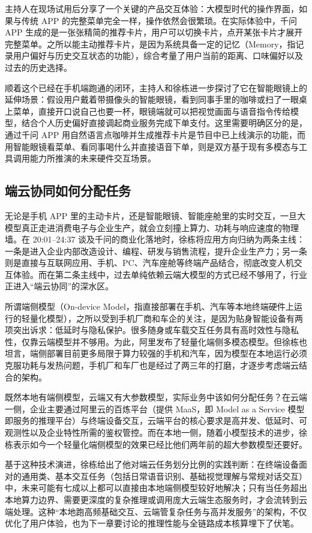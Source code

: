 \documentclass[UTF8,a4paper,11pt,fontset=fandol]{ctexart}
\begin{document}
主持人在现场试用后分享了一个关键的产品交互体验：大模型时代的操作界面，如果与传统 APP 的完整菜单完全一样，操作依然会很繁琐。在实际体验中，千问 APP 生成的是一张张精简的推荐卡片，用户可以切换卡片，点开某张卡片才展开完整菜单。之所以能主动推荐卡片，是因为系统具备一定的记忆（Memory，指记录用户偏好与历史交互状态的功能），综合考量了用户当前的距离、口味偏好以及过去的历史选择。

顺着这个已经在手机端跑通的闭环，主持人和徐栋进一步探讨了它在智能眼镜上的延伸场景：假设用户戴着带摄像头的智能眼镜，看到同事手里的咖啡或扫了一眼桌上菜单，直接开口说自己也要一杯，眼镜端就可以把视觉画面与语音指令传给模型，结合个人历史偏好直接调起商业服务完成下单支付。这里需要明确区分的是，通过千问 APP 用自然语言点咖啡并生成推荐卡片是节目中已上线演示的功能，而用智能眼镜看菜单、看同事喝什么并直接语音下单，则是双方基于现有多模态与工具调用能力所推演的未来硬件交互场景。

\subsection{端云协同如何分配任务}
无论是手机 APP 里的主动卡片，还是智能眼镜、智能座舱里的实时交互，一旦大模型真正走进消费电子与企业生产，就会立刻撞上算力、功耗与响应速度的物理墙。在 20:01–24:37 谈及千问的商业化落地时，徐栋将应用方向归纳为两条主线：一条是进入企业内部改造设计、编程、研发与销售流程，提升企业生产力；另一条则是直接与互联网应用、手机、PC、汽车座舱等终端产品结合，彻底改变人机交互体验。而在第二条主线中，过去单纯依赖云端大模型的方式已经不够用了，行业正进入“端云协同”的深水区。

所谓端侧模型（On-device Model，指直接部署在手机、汽车等本地终端硬件上运行的轻量化模型），之所以受到手机厂商和车企的关注，是因为贴身智能设备有两项突出诉求：低延时与隐私保护。很多随身或车载交互任务具有高时效性与隐私性，仅靠云端模型并不够用。为此，阿里发布了轻量化端侧多模态模型。但徐栋也坦言，端侧部署目前更多局限于算力较强的手机和汽车，因为模型在本地运行必须克服功耗与发热问题，手机厂和车厂也是经过了两三年的打磨，才逐步考虑端云结合的架构。

既然本地有端侧模型，云端又有大参数模型，实际业务中该如何分配任务？在云端一侧，企业主要通过阿里云的百炼平台（提供 MaaS，即 Model as a Service 模型即服务的推理平台）与终端设备交互，云端平台的核心要求是高并发、低延时、可观测性以及企业特性所需的鉴权管控。而在本地一侧，随着小模型技术的进步，徐栋表示如今一个轻量化端侧模型的效果已经比他们两年前的超大参数模型还要好。

基于这种技术演进，徐栋给出了他对端云任务划分比例的实践判断：在终端设备面对的通用类、基本交互任务（包括日常语音识别、基础视觉理解与常规对话交互）中，未来可能有七成以上都可以直接由本地端侧模型较好地解决；只有当任务超出本地算力边界、需要更深度的复杂推理或调用庞大云端生态服务时，才会流转到云端处理。这种“本地跑高频基础交互、云端管复杂任务与高并发服务”的架构，不仅优化了用户体验，也为下一章要讨论的推理性能与全链路成本核算埋下了伏笔。
\end{document}
